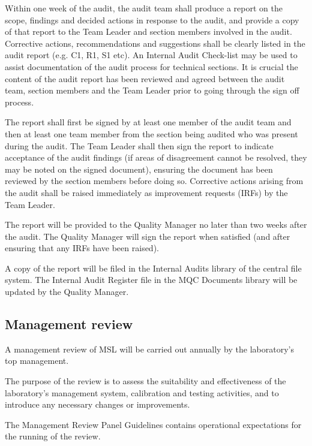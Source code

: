 Within one week of the audit, the audit team shall produce a report on the scope, findings and decided actions in response to the audit, and provide a copy of that report to the Team Leader and section members involved in the audit.  Corrective actions, recommendations and suggestions shall be clearly listed in the audit report (e.g. C1, R1, S1 etc). An Internal Audit Check-list may be used to assist documentation of the audit process for technical sections. It is crucial the content of the audit report has been reviewed and agreed between the audit team, section members and the Team Leader prior to going through the sign off process.

The report shall first be signed by at least one member of the audit team and then at least one team member from the section being audited who was present during the audit. The Team Leader shall then sign the report to indicate acceptance of the audit findings (if areas of disagreement cannot be resolved, they may be noted on the signed document), ensuring the document has been reviewed by the section members before doing so. Corrective actions arising from the audit shall be raised immediately as improvement requests (IRFs) by the Team Leader.

The report will be provided to the Quality Manager no later than two weeks after the audit. The Quality Manager will sign the report when satisfied (and after ensuring that any IRFs have been raised). 

A copy of the report will be filed in the Internal Audits library of the central file system. The Internal Audit Register file in the MQC Documents library will be updated by the Quality Manager.

\subsection{Management review}
\label{ss:management_review}
A management review of MSL will be carried out annually by the laboratory’s top management. 

The purpose of the review is to assess the suitability and effectiveness of the laboratory's management system, calibration and testing activities, and to introduce any necessary changes or improvements.  

The Management Review Panel Guidelines \cite{MSL_Management_Review_Guidelines} contains operational expectations for the running of the review.


